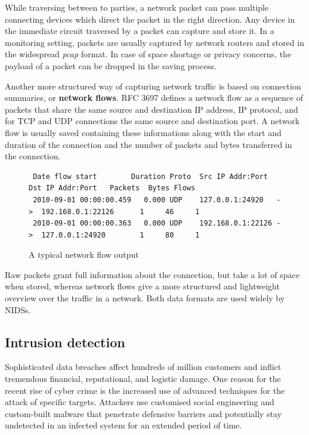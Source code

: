 \documentclass[a4paper,12pt,twoside]{article}
\begin{document}
While traversing between to parties, a network packet can pass multiple connecting devices which direct the packet in the right direction. Any device in the immediate circuit traversed by a packet can capture and store it. In a monitoring setting, packets are usually captured by network routers and stored in the widespread \textit{pcap} format. In case of space shortage or privacy concerns, the payload of a packet can be dropped in the saving process.


Another more structured way of capturing network traffic is based on connection summaries, or \textbf{network flows}. RFC 3697 \cite{brownlee1999traffic} defines a network flow as a sequence of packets that share the same source and destination IP address, IP protocol, and for TCP and UDP connections the same source and destination port. A network flow is usually saved containing these informations along with the start and duration of the connection and the number of packets and bytes transferred in the connection.


\begin{figure}[h!]
\scriptsize
\centering
\begin{verbatim}
 Date flow start        Duration Proto  Src IP Addr:Port      Dst IP Addr:Port   Packets  Bytes Flows
 2010-09-01 00:00:00.459   0.000 UDP    127.0.0.1:24920   ->  192.168.0.1:22126      1     46     1
 2010-09-01 00:00:00.363   0.000 UDP    192.168.0.1:22126 ->  127.0.0.1:24920        1     80     1
\end{verbatim}
\normalsize
\caption{A typical network flow output}
\end{figure}


Raw packets grant full information about the connection, but take a lot of space when stored, whereas network flows give a more structured and lightweight overview over the traffic in a network. Both data formats are used widely by NIDSs.

\subsection{Intrusion detection}

Sophisticated data breaches affect hundreds of million customers and inflict tremendous financial, reputational, and logistic damage. One reason for the recent rise of cyber crime is the increased use of advanced techniques for the attack of specific targets. Attackers use customised social engineering and custom-built malware that penetrate defensive barriers and potentially stay undetected in an infected system for an extended period of time. 
\end{document}
